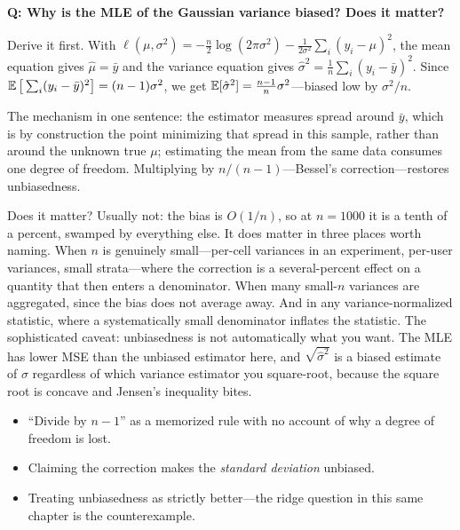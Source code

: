 \begin{interviewq}
\textbf{Q: Why is the MLE of the Gaussian variance biased? Does it matter?}

 \quad {} \quad \badgefreq{\freqmed}

\stronganswer

Derive it first. With $\ell(\mu,\sigma^2) = -\tfrac{n}{2}\log(2\pi\sigma^2) - \tfrac{1}{2\sigma^2}\sum_i (y_i - \mu)^2$, the mean equation gives $\hat\mu = \bar y$ and the variance equation gives $\hat\sigma^2 = \tfrac{1}{n}\sum_i (y_i - \bar y)^2$. Since $\operatorname{\mathbb{E}}\big[\sum_i (y_i - \bar y)^2\big] = (n-1)\sigma^2$, we get $\operatorname{\mathbb{E}}[\hat\sigma^2] = \tfrac{n-1}{n}\sigma^2$---biased low by $\sigma^2/n$.

The mechanism in one sentence: the estimator measures spread around $\bar y$, which is by construction the point minimizing that spread in this sample, rather than around the unknown true $\mu$; estimating the mean from the same data consumes one degree of freedom. Multiplying by $n/(n-1)$---Bessel's correction---restores unbiasedness.

Does it matter? Usually not: the bias is $O(1/n)$, so at $n = 1000$ it is a tenth of a percent, swamped by everything else. It does matter in three places worth naming. When $n$ is genuinely small---per-cell variances in an experiment, per-user variances, small strata---where the correction is a several-percent effect on a quantity that then enters a denominator. When many small-$n$ variances are aggregated, since the bias does not average away. And in any variance-normalized statistic, where a systematically small denominator inflates the statistic. The sophisticated caveat: unbiasedness is not automatically what you want. The MLE has lower MSE than the unbiased estimator here, and $\sqrt{\hat\sigma^2}$ is a biased estimate of $\sigma$ regardless of which variance estimator you square-root, because the square root is concave and Jensen's inequality bites.

\redflags
\begin{itemize}
    \item ``Divide by $n-1$'' as a memorized rule with no account of why a degree of freedom is lost.
    \item Claiming the correction makes the \textit{standard deviation} unbiased.
    \item Treating unbiasedness as strictly better---the ridge question in this same chapter is the counterexample.
\end{itemize}


\end{interviewq}

